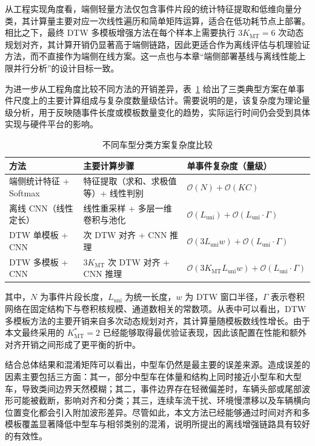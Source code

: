 从工程实现角度看，端侧轻量方法仅包含事件片段的统计特征提取和低维向量分类，其计算量主要对应一次线性遍历和简单矩阵运算，适合在低功耗节点上部署。相比之下，最终 DTW 多模板增强方法在每个样本上需要执行 $3K_{\mathrm{MT}}=6$ 次动态规划对齐，其计算开销仍显著高于端侧链路，因此更适合作为离线评估与机理验证方法，而不直接作为端侧在线方案。这一点也与本章“端侧部署基线与离线性能上限并行分析”的设计目标一致。

为进一步从工程角度比较不同方法的开销差异，表~\ref{tab:ch3_complexity} 给出了三类典型方案在单事件尺度上的主要计算组成与复杂度数量级估计。需要说明的是，该复杂度为理论量级分析，用于反映随事件长度或模板数量变化的趋势，实际运行时间仍会受到具体实现与硬件平台的影响。

\begin{table}[!htbp]
\centering
\small
\caption{不同车型分类方案复杂度比较}
\label{tab:ch3_complexity}
\setlength{\tabcolsep}{5pt}
\renewcommand{\arraystretch}{1.15}
\begin{tabularx}{\linewidth}{>{\raggedright\arraybackslash}p{2.8cm} >{\raggedright\arraybackslash}X >{\raggedright\arraybackslash}p{4.1cm}}
\hline
方法 & 主要计算步骤 & 单事件复杂度（量级） \\
\hline
端侧统计特征 + Softmax & 特征提取（求和、求极值等）+ 线性判别 & $\mathcal{O}(N)+\mathcal{O}(KC)$ \\
离线 CNN（线性定长） & 线性重采样 + 多层一维卷积与池化 & $\mathcal{O}(L_{\mathrm{uni}})+\mathcal{O}(L_{\mathrm{uni}}\cdot\Gamma)$ \\
DTW 单模板 + CNN & 3 次 DTW 对齐 + CNN 推理 & $\mathcal{O}(3L_{\mathrm{uni}}w)+\mathcal{O}(L_{\mathrm{uni}}\cdot\Gamma)$ \\
DTW 多模板 + CNN & $3K_{\mathrm{MT}}$ 次 DTW 对齐 + CNN 推理 & $\mathcal{O}(3K_{\mathrm{MT}}L_{\mathrm{uni}}w)+\mathcal{O}(L_{\mathrm{uni}}\cdot\Gamma)$ \\
\hline
\end{tabularx}
\end{table}

其中，$N$ 为事件片段长度，$L_{\mathrm{uni}}$ 为统一长度，$w$ 为 DTW 窗口半径，$\Gamma$ 表示卷积网络在固定结构下与卷积核规模、通道数相关的常数项。从表中可以看出，DTW 多模板方法的主要开销来自多次动态规划对齐，其计算量随模板数线性增长。由于本文最终采用的 $K_{\mathrm{MT}}^\ast=2$ 已经能够取得最优验证表现，因此该配置在性能和额外对齐开销之间形成了更平衡的折中。

结合总体结果和混淆矩阵可以看出，中型车仍然是最主要的误差来源。造成误差的因素主要包括三方面：其一，部分中型车在体量和结构上同时接近小型车和大型车，导致类间边界天然模糊；其二，事件边界存在轻微偏差时，车辆头部或尾部波形可能被截断，影响对齐和分类；其三，连续车流干扰、环境慢漂移以及车辆横向位置变化都会引入附加波形差异。尽管如此，本文方法已经能够通过时间对齐和多模板覆盖显著降低中型车与相邻类别的混淆，说明所提出的离线增强链路具有较好的有效性。


